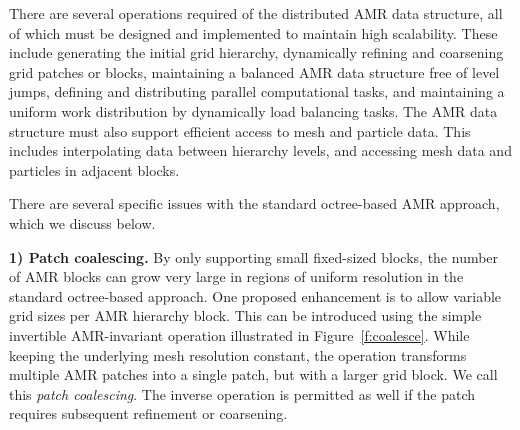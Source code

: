 \documentclass[11pt,letterpaper]{article}
\newcommand{\paramesh}{\textsf{PARAMESH}}
\begin{document}


There are several operations required of the distributed AMR data
structure, all of which must be designed and implemented to maintain
high scalability.  These include generating the initial grid
hierarchy, dynamically refining and coarsening grid patches or blocks,
maintaining a balanced AMR data structure free of level jumps,
defining and distributing parallel computational tasks, and
maintaining a uniform work distribution by dynamically load balancing
tasks.  The AMR data structure must also support efficient access to
mesh and particle data.  This includes interpolating data between
hierarchy levels, and accessing mesh data and particles in adjacent
blocks.

There are several specific issues with the standard octree-based AMR
approach, which we discuss below.


\textbf{1) Patch coalescing.} 
By only supporting small fixed-sized blocks, the number of AMR blocks
can grow very large in regions of uniform resolution in the standard octree-based
approach.  One proposed enhancement  is to allow variable grid sizes per AMR
hierarchy block.  This can be introduced using the simple invertible
AMR-invariant operation illustrated in Figure~\ref{f:coalesce}.  While
keeping the underlying mesh resolution constant, the operation
transforms multiple AMR patches into a single patch, but with a larger
grid block.  We call this \textit{patch coalescing}.  The inverse
operation is permitted as well if the patch requires subsequent
refinement or coarsening.
\end{document}
